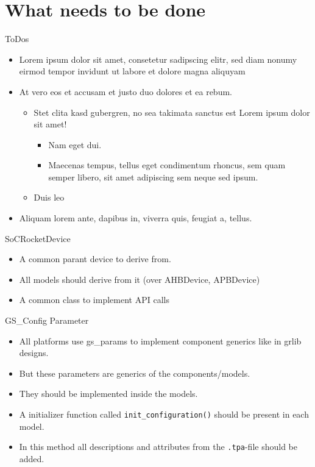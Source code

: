 \documentclass[fleqn,11pt,aspectratio=43]{beamer}
\begin{document}
\section{What needs to be done}

\begin{frame}{ToDos}
  \begin{itemize}
    \item Lorem ipsum dolor sit amet, consetetur sadipscing elitr, sed diam
      nonumy eirmod tempor invidunt ut labore et dolore magna aliquyam
    \item At vero eos et accusam et justo duo dolores et ea rebum.
      \begin{itemize}
        \item Stet clita kasd gubergren, no sea takimata sanctus est Lorem ipsum
          dolor sit amet!
          \begin{itemize}
            \item Nam eget dui.
            \item Maecenas tempus, tellus eget condimentum rhoncus, sem quam
              semper libero, sit amet adipiscing sem neque sed ipsum.
          \end{itemize}
        \item Duis leo
      \end{itemize}
    \item Aliquam lorem ante, dapibus in, viverra quis, feugiat a, tellus. 
  \end{itemize}
\end{frame}

\begin{frame}{SoCRocketDevice}
  \begin{itemize}
    \item A common parant device to derive from.
    \item All models should derive from it (over AHBDevice, APBDevice)
    \item A common class to implement API calls
  \end{itemize}
\end{frame}

\begin{frame}{GS\_Config Parameter}
  \begin{itemize}
    \item All platforms use gs\_params to implement component generics like in grlib designs.
    \item But these parameters are generics of the components/models. 
    \item They should be implemented inside the models.
    \item A initializer function called {\tt init\_configuration()} should be present in each model.
    \item In this method all descriptions and attributes from the {\tt .tpa}-file should be added.
  \end{itemize}
\end{frame}
\end{document}
